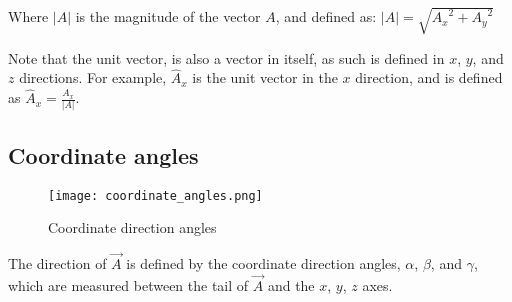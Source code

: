 \documentclass{scrartcl}
\begin{document}
Where \(|A|\) is the magnitude of the vector \(A\), 
and defined as: \(|A| = \sqrt{{A_x}^2 + {A_y}^2}\)

Note that the unit vector, is also a vector in itself, as such is defined in \(x\), \(y\), and \(z\) directions.
For example, \(\hat{A}_x\) is the unit vector in the \(x\) direction, and is defined as \(\hat{A}_x = \frac{A_x}{|A|}\).

\subsection{Coordinate angles}

\begin{figure}[h]
    \centering
    \texttt{[image: coordinate\_angles.png]}
    \caption{Coordinate direction angles}
    \label{fig:coordinate_direction_angles}
\end{figure}

The direction of \(\vec{A}\) is defined by the coordinate direction angles,
\(\alpha\), \(\beta\), and \(\gamma\),
which are measured between the tail of \(\vec{A}\) and the \(x\), \(y\), \(z\) axes.




\end{document}
